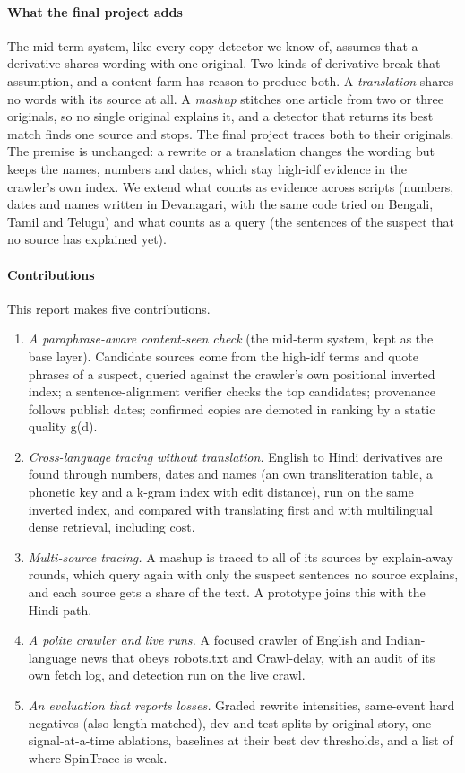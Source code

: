 \documentclass[11pt,a4paper]{article}
\begin{document}
\paragraph{What the final project adds} The mid-term system, like every copy detector we know of, assumes that a derivative shares wording with one original. Two kinds of derivative break that assumption, and a content farm has reason to produce both. A \emph{translation} shares no words with its source at all. A \emph{mashup} stitches one article from two or three originals, so no single original explains it, and a detector that returns its best match finds one source and stops. The final project traces both to their originals. The premise is unchanged: a rewrite or a translation changes the wording but keeps the names, numbers and dates, which stay high-idf evidence in the crawler's own index. We extend what counts as evidence across scripts (numbers, dates and names written in Devanagari, with the same code tried on Bengali, Tamil and Telugu) and what counts as a query (the sentences of the suspect that no source has explained yet).

\paragraph{Contributions} This report makes five contributions.
\begin{enumerate}
\item \emph{A paraphrase-aware content-seen check} (the mid-term system, kept as the base layer). Candidate sources come from the high-idf terms and quote phrases of a suspect, queried against the crawler's own positional inverted index; a sentence-alignment verifier checks the top candidates; provenance follows publish dates; confirmed copies are demoted in ranking by a static quality g(d).
\item \emph{Cross-language tracing without translation.} English to Hindi derivatives are found through numbers, dates and names (an own transliteration table, a phonetic key and a k-gram index with edit distance), run on the same inverted index, and compared with translating first and with multilingual dense retrieval, including cost.
\item \emph{Multi-source tracing.} A mashup is traced to all of its sources by explain-away rounds, which query again with only the suspect sentences no source explains, and each source gets a share of the text. A prototype joins this with the Hindi path.
\item \emph{A polite crawler and live runs.} A focused crawler of English and Indian-language news that obeys robots.txt and Crawl-delay, with an audit of its own fetch log, and detection run on the live crawl.
\item \emph{An evaluation that reports losses.} Graded rewrite intensities, same-event hard negatives (also length-matched), dev and test splits by original story, one-signal-at-a-time ablations, baselines at their best dev thresholds, and a list of where SpinTrace is weak.
\end{enumerate}
\end{document}
